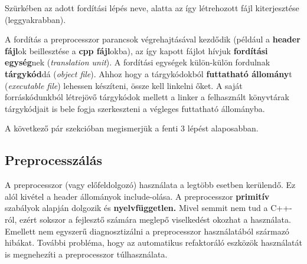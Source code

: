 \documentclass[a4paper,11.5pt,table]{article}
\begin{document}
\begin{center}
		\smallskip
		
		Szürkében az adott fordítási lépés neve, alatta az így létrehozott fájl kiterjesztése (leggyakrabban).	
	\end{center}
	A fordítás a preprocesszor parancsok végrehajtásával kezdődik (például a \textbf{header fájl}ok beillesztése a \textbf{cpp fájl}okba), az így kapott fájlot hívjuk \textbf{fordítási egység}nek (\textit{translation unit}). A fordítási egységek külön-külön fordulnak \textbf{tárgykód}dá (\textit{object file}). Ahhoz hogy a tárgykódokból \textbf{futtatható állomány}t (\textit{executable file}) lehessen készíteni, össze kell linkelni őket. A saját forráskódunkból létrejövő tárgykódok mellett a linker a felhasznált könyvtárak tárgykódjait is bele fogja szerkeszteni a végleges futtatható állományba.
	\medskip
	
	A következő pár szekcióban megismerjük a fenti 3 lépést alaposabban.
	
	\subsection{Preprocesszálás}
	A preprocesszor (vagy előfeldolgozó) használata a legtöbb esetben kerülendő. Ez alól kivétel a header állományok include-olása. A preprocesszor \textbf{primitív} szabályok alapján dolgozik és \textbf{nyelvfüggetlen.} Mivel semmit nem tud a C++-ról, ezért sokszor a fejlesztő számára meglepő viselkedést okozhat a használata. Emellett nem egyszerű diagnosztizálni a preprocesszor használatából származó hibákat. További probléma, hogy az automatikus refaktoráló eszközök használatát is megnehezíti a preprocesszor túlhasználata.
	
\end{document}
